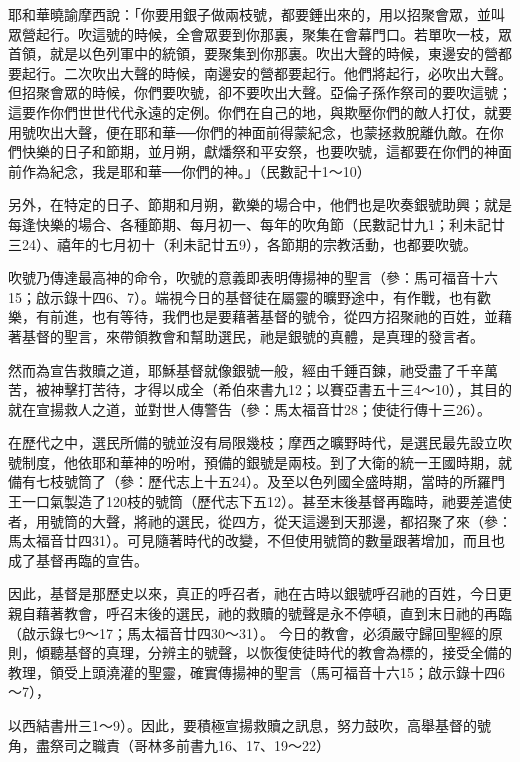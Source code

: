 耶和華曉諭摩西說：「你要用銀子做兩枝號，都要錘出來的，用以招聚會眾，並叫眾營起行。吹這號的時候，全會眾要到你那裏，聚集在會幕門口。若單吹一枝，眾首領，就是以色列軍中的統領，要聚集到你那裏。吹出大聲的時候，東邊安的營都要起行。二次吹出大聲的時候，南邊安的營都要起行。他們將起行，必吹出大聲。但招聚會眾的時候，你們要吹號，卻不要吹出大聲。亞倫子孫作祭司的要吹這號；這要作你們世世代代永遠的定例。你們在自己的地，與欺壓你們的敵人打仗，就要用號吹出大聲，便在耶和華──你們的神面前得蒙紀念，也蒙拯救脫離仇敵。在你們快樂的日子和節期，並月朔，獻燔祭和平安祭，也要吹號，這都要在你們的神面前作為紀念，我是耶和華──你們的神。」（民數記十1～10）


另外，在特定的日子、節期和月朔，歡樂的場合中，他們也是吹奏銀號助興；就是每逢快樂的場合、各種節期、每月初一、每年的吹角節（民數記廿九1；利未記廿三24）、禧年的七月初十（利未記廿五9），各節期的宗教活動，也都要吹號。


吹號乃傳達最高神的命令，吹號的意義即表明傳揚神的聖言（參：馬可福音十六15；啟示錄十四6、7）。端視今日的基督徒在屬靈的曠野途中，有作戰，也有歡樂，有前進，也有等待，我們也是要藉著基督的號令，從四方招聚祂的百姓，並藉著基督的聖言，來帶領教會和幫助選民，祂是銀號的真體，是真理的發言者。

然而為宣告救贖之道，耶穌基督就像銀號一般，經由千錘百鍊，祂受盡了千辛萬苦，被神擊打苦待，才得以成全（希伯來書九12；以賽亞書五十三4～10），其目的就在宣揚救人之道，並對世人傳警告（參：馬太福音廿28；使徒行傳十三26）。


在歷代之中，選民所備的號並沒有局限幾枝；摩西之曠野時代，是選民最先設立吹號制度，他依耶和華神的吩咐，預備的銀號是兩枝。到了大衛的統一王國時期，就備有七枝號筒了（參：歷代志上十五24）。及至以色列國全盛時期，當時的所羅門王一口氣製造了120枝的號筒（歷代志下五12）。甚至末後基督再臨時，祂要差遣使者，用號筒的大聲，將祂的選民，從四方，從天這邊到天那邊，都招聚了來（參：馬太福音廿四31）。可見隨著時代的改變，不但使用號筒的數量跟著增加，而且也成了基督再臨的宣告。

因此，基督是那歷史以來，真正的呼召者，祂在古時以銀號呼召祂的百姓，今日更親自藉著教會，呼召末後的選民，祂的救贖的號聲是永不停頓，直到末日祂的再臨（啟示錄七9～17；馬太福音廿四30～31）。
今日的教會，必須嚴守歸回聖經的原則，傾聽基督的真理，分辨主的號聲，以恢復使徒時代的教會為標的，接受全備的教理，領受上頭澆灌的聖靈，確實傳揚神的聖言（馬可福音十六15；啟示錄十四6～7），

以西結書卅三1～9）。因此，要積極宣揚救贖之訊息，努力鼓吹，高舉基督的號角，盡祭司之職責（哥林多前書九16、17、19～22）





